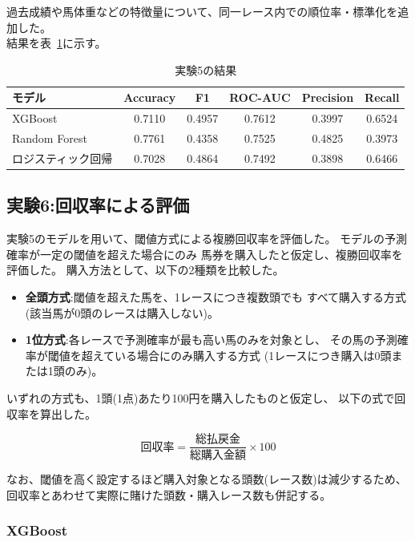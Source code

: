 \documentclass[dvipdfmx, a4paper, 11pt, titlepage]{jsarticle}
\begin{document}
過去成績や馬体重などの特徴量について、同一レース内での順位率・標準化を追加した。\\
結果を表~\ref{tab:exp5}に示す。

\begin{table}[H]
  \centering
  \caption{実験5の結果}
  \label{tab:exp5}
  \begin{tabular}{lccccc}
    \toprule
    モデル & Accuracy & F1 & ROC-AUC & Precision & Recall \\
    \midrule
    XGBoost           & 0.7110 & 0.4957 & 0.7612 & 0.3997 & 0.6524 \\
    Random Forest     & 0.7761 & 0.4358 & 0.7525 & 0.4825 & 0.3973 \\
    ロジスティック回帰 & 0.7028 & 0.4864 & 0.7492 & 0.3898 & 0.6466 \\
    \bottomrule
  \end{tabular}
\end{table}

\subsection{実験6:回収率による評価}

実験5のモデルを用いて、閾値方式による複勝回収率を評価した。
モデルの予測確率が一定の閾値を超えた場合にのみ
馬券を購入したと仮定し、複勝回収率を評価した。
購入方法として、以下の2種類を比較した。

\begin{itemize}
  \item \textbf{全頭方式}:閾値を超えた馬を、1レースにつき複数頭でも
        すべて購入する方式(該当馬が0頭のレースは購入しない)。
  \item \textbf{1位方式}:各レースで予測確率が最も高い馬のみを対象とし、
        その馬の予測確率が閾値を超えている場合にのみ購入する方式
        (1レースにつき購入は0頭または1頭のみ)。
\end{itemize}

いずれの方式も、1頭(1点)あたり100円を購入したものと仮定し、
以下の式で回収率を算出した。

\[
  \text{回収率} = \frac{\text{総払戻金}}{\text{総購入金額}} \times 100
\]

なお、閾値を高く設定するほど購入対象となる頭数(レース数)は減少するため、
回収率とあわせて実際に賭けた頭数・購入レース数も併記する。


\subsubsection*{XGBoost}
\end{document}
